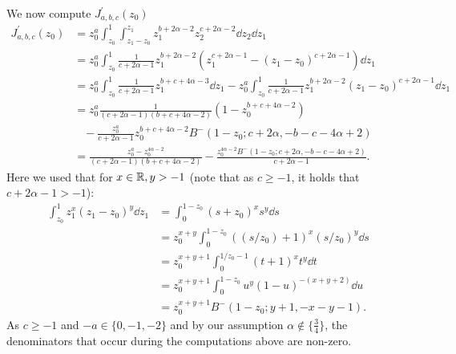 We now compute $J_{a,b,c}^\prime(z_0)$
\begin{align*}
	J_{a,b,c}^\prime(z_0) 
	&= z_0^a \int_{z_0}^1 \int_{z_1-z_0}^{z_1}  z_1^{b+2\alpha-2} z_2^{c+2\alpha-2} {\dd} z_2 {\dd} z_1  \\
 	&= z_0^a \int_{z_0}^1 \frac{1}{c+2\alpha-1}  z_1^{b+2\alpha-2}( z_1^{c+2\alpha-1}-(z_1-z_0)^{c+2\alpha-1})  {\dd} z_1  \\
 	&=z_0^a \int_{z_0}^1 \frac{1}{c+2\alpha-1} z_1^{b+c+4\alpha-3} {\dd } z_1 -z_0^{a} \int_{z_0}^1 	
 		\frac{1}{c+2\alpha-1}z_1^{b+2\alpha-2}(z_1-z_0)^{c+2\alpha-1}  {\dd} z_1  \\
 	&= z_0^a  \frac{1}{(c+2\alpha-1)(b+c+4\alpha-2)}(1-z_0^{b+c+4\alpha-2}) \\
 	&\hspace{10pt}- \frac{z_0^a}{c+2\alpha-1}z_0^{b+c+4\alpha-2}B^-(1-z_0;c+2\alpha,-b-c-4\alpha+2) \\
	&= \frac{z_0^a -z_0^{4\alpha-2}}{(c+2\alpha-1)(b+c+4\alpha-2)}  
		- \frac{z_0^{4\alpha -2}B^-(1-z_0;c+2\alpha,-b-c-4\alpha+2)}{c+2\alpha-1}.  
\end{align*}
Here we used that for $x  \in {\ensuremath{\mathbb R}},y>-1$ (note that as $c\geq -1$, it holds that $c+2\alpha-1 >-1$):
\begin{align*}
 \int_{z_0}^{1} z_1^x (z_1-z_0)^y {\dd} z_1 
 &= \int_0^{1-z_0} (s+z_0)^x s^y {\dd} s \\
 &= z_0^{x+y} \int_0^{1-z_0} \left( (s/z_0) + 1 \right)^x (s/z_0)^y {\dd} s \\
 &= z_0^{x+y+1} \int_{0}^{1/z_0 -1 } (t+1)^x t^y {\dd} t \\
 &= z_0^{x+y+1} \int_0^{1-z_0} u^y (1-u)^{-(x+y+2)} {\dd} u \\
 &= z_0^{x+y+1} B^-(1-z_0; y+1,-x-y-1 ).
\end{align*}
As $c \geq -1$ and $-a \in \{0,-1,-2\}$ and by our assumption $\alpha \not \in \{\frac{3}{4}\}$, the denominators 
that occur during the computations above are non-zero. 

